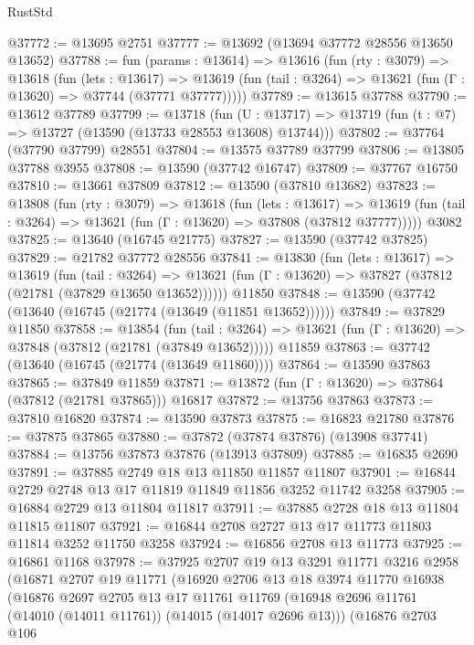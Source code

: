 \begin{lexlean}{RustStd}
\begin{coremodule}
@37772 := @13695 @2751
@37777 := @13692 (@13694 @37772 @28556 @13650 @13652)
@37788 := fun (params : @13614) =>
  @13616
    (fun (rty : @3079) =>
    @13618
      (fun (lets : @13617) =>
      @13619 (fun (tail : @3264) => @13621 (fun (Γ : @13620) => @37744 (@37771 @37777)))))
@37789 := @13615 @37788
@37790 := @13612 @37789
@37799 := @13718
    (fun (U : @13717) => @13719 (fun (t : @7) => @13727 (@13590 (@13733 @28553 @13608) @13744)))
@37802 := @37764 (@37790 @37799) @28551
@37804 := @13575 @37789 @37799
@37806 := @13805 @37788 @3955
@37808 := @13590 (@37742 @16747)
@37809 := @37767 @16750
@37810 := @13661 @37809
@37812 := @13590 (@37810 @13682)
@37823 := @13808
    (fun (rty : @3079) =>
    @13618
      (fun (lets : @13617) =>
      @13619 (fun (tail : @3264) => @13621 (fun (Γ : @13620) => @37808 (@37812 @37777)))))
    @3082
@37825 := @13640 (@16745 @21775)
@37827 := @13590 (@37742 @37825)
@37829 := @21782 @37772 @28556
@37841 := @13830
    (fun (lets : @13617) =>
    @13619
      (fun (tail : @3264) =>
      @13621 (fun (Γ : @13620) => @37827 (@37812 (@21781 (@37829 @13650 @13652))))))
    @11850
@37848 := @13590 (@37742 (@13640 (@16745 (@21774 (@13649 (@11851 @13652))))))
@37849 := @37829 @11850
@37858 := @13854
    (fun (tail : @3264) => @13621 (fun (Γ : @13620) => @37848 (@37812 (@21781 (@37849 @13652)))))
    @11859
@37863 := @37742 (@13640 (@16745 (@21774 (@13649 @11860))))
@37864 := @13590 @37863
@37865 := @37849 @11859
@37871 := @13872 (fun (Γ : @13620) => @37864 (@37812 (@21781 @37865))) @16817
@37872 := @13756 @37863
@37873 := @37810 @16820
@37874 := @13590 @37873
@37875 := @16823 @21780
@37876 := @37875 @37865
@37880 := @37872 (@37874 @37876) (@13908 @37741)
@37884 := @13756 @37873 @37876 (@13913 @37809)
@37885 := @16835 @2690
@37891 := @37885 @2749 @18 @13 @11850 @11857 @11807
@37901 := @16844 @2729 @2748 @13 @17 @11819 @11849 @11856 @3252 @11742 @3258
@37905 := @16884 @2729 @13 @11804 @11817
@37911 := @37885 @2728 @18 @13 @11804 @11815 @11807
@37921 := @16844 @2708 @2727 @13 @17 @11773 @11803 @11814 @3252 @11750 @3258
@37924 := @16856 @2708 @13 @11773
@37925 := @16861 @1168
@37978 := @37925
    @2707
    @19
    @13
    @3291
    @11771
    @3216
    @2958
    (@16871
      @2707
      @19
      @11771
      (@16920
        @2706
        @13
        @18
        @3974
        @11770
        @16938
        (@16876
          @2697
          @2705
          @13
          @17
          @11761
          @11769
          (@16948 @2696 @11761 (@14010 (@14011 @11761)) (@14015 (@14017 @2696 @13)))
          (@16876
            @2703
            @106

\end{coremodule}
\end{lexlean}
